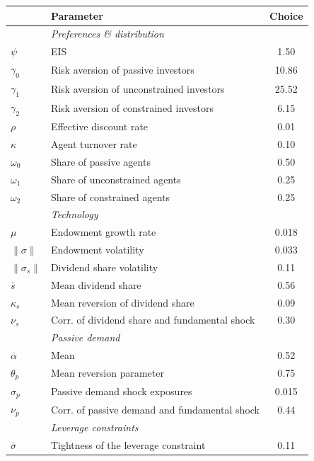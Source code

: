 \begin{tabular}{llc}
	\toprule	
	& Parameter & Choice  \\
	\midrule 
	&\small \emph{Preferences \& distribution}  & \\
	\midrule		
	$\psi$         & EIS & 1.50   \\
	$\gamma_0$     & Risk aversion of passive investors               & 10.86    \\
    $\gamma_1$     & Risk aversion of unconstrained investors                & 25.52 \\ 
	$\gamma_2$     & Risk aversion of constrained investors                & 6.15 \\
	$\rho$         & Effective discount rate                  & 0.01 \\
    $\kappa$       & Agent turnover rate                      & 0.10 \\
    $\omega_0$    & Share of passive agents                & 0.50 \\
    $\omega_1$    & Share of unconstrained agents                & 0.25 \\
	$\omega_2$    & Share of constrained agents                & 0.25 \\
	\midrule 
	& \small \emph{Technology}  & \\
	\midrule 
	$\mu$          & Endowment growth rate                    & 0.018  \\
	$\|\sigma\|$       & Endowment volatility                     & 0.033  \\
    $\|\sigma_s\|$     & Dividend share volatility                & 0.11 \\ 
    $\bar{s}$      & Mean dividend share                      & 0.56 \\ 
    $\kappa_s$     & Mean reversion of dividend share         & 0.09 \\
	$\nu_s$     & Corr. of dividend share and fundamental shock         & 0.30 \\
	\midrule 
	&\small \emph{Passive demand}&  \\
	\midrule
	$\overline{\alpha}$ & Mean &  0.52	\\
    $\theta_p$              & Mean reversion parameter  &  0.75 	\\
    $\sigma_p$             & Passive demand shock exposures &  0.015	\\
    $\nu_p$                  & Corr. of passive demand and fundamental shock & 0.44 \\ 

	\midrule
	& \small \emph{Leverage constraints}  & \\
	\midrule 
	$\overline{\sigma}$ & Tightness of the leverage constraint &  0.11	\\
	\bottomrule
\end{tabular}

